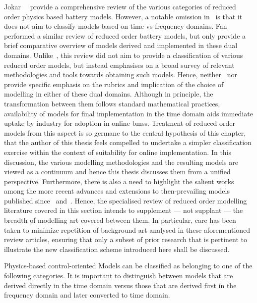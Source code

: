 Jokar~\etal~\cite{Jokar2016}  provide  a  comprehensive review  of  the  various
categories of  reduced order  physics based battery  models. However,  a notable
omission  in~\cite{Jokar2016}  is  that  it  does not  aim  to  classify  models
based  on  time-vs-frequency  domains.  Fan~\etal{}~\cite{Fan2015}  performed  a
similar  review of  reduced  order  battery models,  but  only  provide a  brief
comparative overview  of models derived  and implemented in these  dual domains.
Unlike~\cite{Jokar2016}, this review did not  aim to provide a classification of
various  reduced  order  models,  but  instead  emphasises  on  a  broad  survey
of  relevant  methodologies and  tools  towards  obtaining such  models.  Hence,
neither~\cite{Jokar2016}  nor~\cite{Fan2015} provide  specific  emphasis on  the
rubrics  and implication  of the  choice of  modelling in  either of  these dual
domains. Although in principle, the transformation between them follows standard
mathematical  practices,~  availability of  models for
final implementation  in the time domain  aids immediate uptake by  industry for
adoption  in online  \gls{bms}s. Treatment  of  reduced order  models from  this
aspect  is  so germane  to  the  central  hypothesis of  this  chapter,  that  the  author of  this  thesis
feels  compelled  to undertake  a  simpler  classification exercise  within  the
context  of  suitability for  online  implementation.  In this  discussion,  the
various  modelling  methodologies and  the  resulting  models  are viewed  as  a
continuum  and hence  this thesis  discusses  them from  a unified  perspective.
Furthermore,  there  is  also  a  need to  highlight  the  salient  works  among
the  more recent  advances and  extensions to  then-prevailing models  published
since~\cite{Jokar2016}  and~\cite{Fan2015}.  Hence,  the specialised  review  of
reduced order modelling literature covered in this section intends to supplement
---  not supplant  --- the  breadth of  modelling art  covered between  them. In
particular,  care  has been  taken  to  minimize  repetition of  background  art
analysed in these aforementioned review articles, ensuring that only a subset of
prior research  that is  pertinent to illustrate  the new  classification scheme
introduced here shall be discussed.


Physics-based control-oriented Models  can be classified as belonging  to one of
the following categories. It
is important to distinguish between models that are derived directly in the time
domain versus  those that are  derived first in  the frequency domain  and later
converted to time domain.


